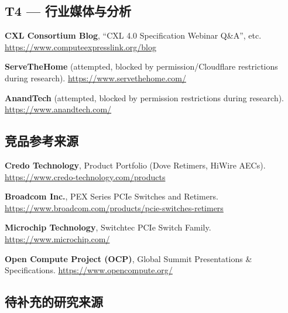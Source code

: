 {}
\subsection*{T4 — 行业媒体与分析}

\begin{enumerate}[label={[T4-\arabic*]}, leftmargin=*, resume]
    \item \textbf{CXL Consortium Blog}, ``CXL 4.0 Specification Webinar Q\&A'', etc.
    \url{https://www.computeexpresslink.org/blog}

    \item \textbf{ServeTheHome} (attempted, blocked by permission/Cloudflare restrictions during research).
    \url{https://www.servethehome.com/}

    \item \textbf{AnandTech} (attempted, blocked by permission restrictions during research).
    \url{https://www.anandtech.com/}
\end{enumerate}

{}
\subsection*{竞品参考来源}

\begin{enumerate}[label={[COMP-\arabic*]}, leftmargin=*, resume]
    \item \textbf{Credo Technology}, Product Portfolio (Dove Retimers, HiWire AECs).
    \url{https://www.credo-technology.com/products}

    \item \textbf{Broadcom Inc.}, PEX Series PCIe Switches and Retimers.
    \url{https://www.broadcom.com/products/pcie-switches-retimers}

    \item \textbf{Microchip Technology}, Switchtec PCIe Switch Family.
    \url{https://www.microchip.com/}

    \item \textbf{Open Compute Project (OCP)}, Global Summit Presentations \& Specifications.
    \url{https://www.opencompute.org/}
\end{enumerate}

{}
\subsection*{待补充的研究来源}

